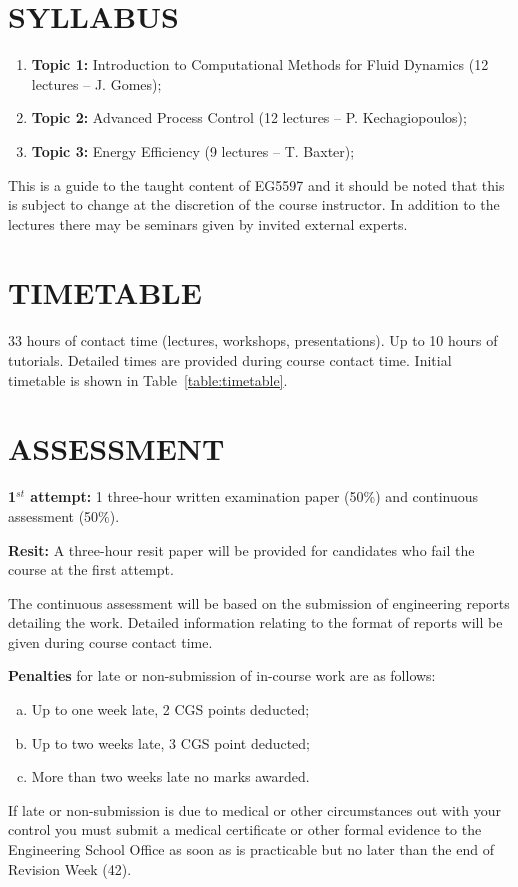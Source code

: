 \documentclass[12pts,a4paper,amsmath,amssymb,floatfix]{article}%
\begin{document}
\section{SYLLABUS}
\begin{enumerate}[{\bf 1.}]
\item {\bf Topic 1:} Introduction to Computational Methods for Fluid Dynamics (12 lectures -- J. Gomes);
\item {\bf Topic 2:} Advanced Process Control (12 lectures -- P. Kechagiopoulos);
\item {\bf Topic 3:} Energy Efficiency (9 lectures -- T. Baxter);
\end{enumerate}

\medskip
This is a guide to the taught content of EG5597 and it should be noted that this is subject to change at the discretion of the course instructor. In addition to the lectures there may be seminars given by invited external experts.


\section{TIMETABLE}
33 hours of contact time (lectures, workshops, presentations). Up to 10 hours of tutorials. Detailed times are provided during course contact time. Initial timetable is shown in Table~\ref{table:timetable}.


\section{ASSESSMENT}

{\bf 1$^{st}$ attempt:} 1 three-hour written examination paper (50$\%$) and continuous assessment (50$\%$). 

{\bf Resit:} A three-hour resit paper will be provided for candidates who fail the course at the first attempt. 

\medskip

The continuous assessment will be based on the submission of engineering reports detailing the work. Detailed information relating to the format of reports will be given during course contact time.

\medskip

{\bf Penalties} for late or non-submission of in-course work are as follows:
\begin{enumerate}[(a)]
\item Up to one week late, 2 CGS points deducted;
\item Up to two weeks late, 3 CGS point deducted;
\item More than two weeks late no marks awarded.
\end{enumerate}
If late or non-submission is due to medical or other circumstances out with your control you must submit a medical certificate or other formal evidence to the Engineering School Office as soon as is practicable but no later than the end of Revision Week (42).
\end{document}
